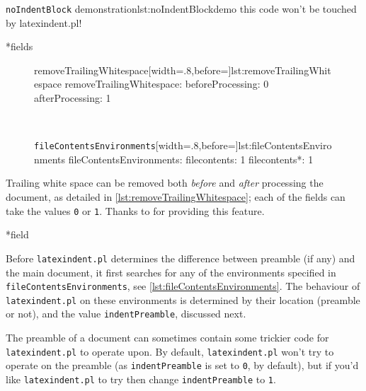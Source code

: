 \documentclass[10pt]{article}
\begin{document}
\begin{cmhlistings}[style=demo,escapeinside={(*@}{@*)}]{\texttt{noIndentBlock} demonstration}{lst:noIndentBlockdemo}
        this code
                won't
     be touched
                    by
             latexindent.pl!
	\end{cmhlistings}

*{fields}

\begin{figure}
\begin{yaml}[firstnumber=71]{removeTrailingWhitespace}[width=.8\linewidth,before=\centering]{lst:removeTrailingWhitespace}
removeTrailingWhitespace:
    beforeProcessing: 0
    afterProcessing: 1
\end{yaml}\\
\vspace{.2cm}
\begin{yaml}{\texttt{fileContentsEnvironments}}[width=.8\linewidth,before=\centering]{lst:fileContentsEnvironments}
fileContentsEnvironments:
    filecontents: 1
    filecontents*: 1
  \end{yaml}
\end{figure}
Trailing white space can be removed both \emph{before} and \emph{after} processing 
the document, as detailed in \cref{lst:removeTrailingWhitespace}; each of the fields 
can take the values \texttt{0} or \texttt{1}.
Thanks to \cite{vosskuhle} for providing this feature.

*{field}

Before \texttt{latexindent.pl} determines the difference between preamble (if any) and the main document,
it first searches for any of the environments specified in \texttt{fileContentsEnvironments}, see
\cref{lst:fileContentsEnvironments}.
  The behaviour of \texttt{latexindent.pl} on these environments is determined by their location (preamble or not), and 
  the value \texttt{indentPreamble}, discussed next.


The preamble of a document can sometimes contain some trickier code
for \texttt{latexindent.pl} to operate upon. By default, \texttt{latexindent.pl}
won't try to operate on the preamble (as \texttt{indentPreamble} is set to \texttt{0},
by default), but if you'd like \texttt{latexindent.pl} to try then change \texttt{indentPreamble} to \texttt{1}.
\end{document}
